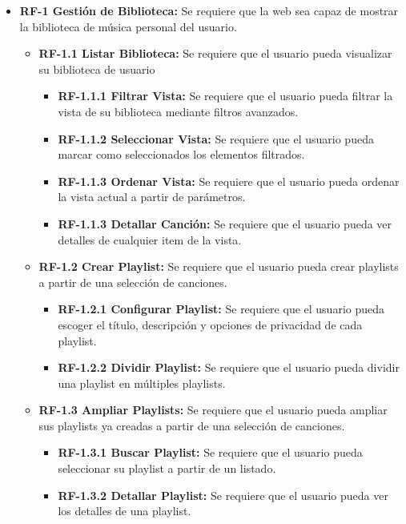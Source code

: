 \begin{itemize}
\tightlist

    \item
        \textbf{RF-1 Gestión de Biblioteca:} Se requiere que la web sea capaz de mostrar la biblioteca de música personal del usuario.
        \begin{itemize}
           \tightlist
           
            \item
                \textbf{RF-1.1 Listar Biblioteca:} Se requiere que el usuario pueda visualizar su biblioteca de usuario
                \begin{itemize}
                    \item
                        \textbf{RF-1.1.1 Filtrar Vista:} Se requiere que el usuario pueda filtrar la vista de su biblioteca mediante filtros avanzados.
                    \item
                        \textbf{RF-1.1.2 Seleccionar Vista:} Se requiere que el usuario pueda marcar como seleccionados los elementos filtrados.
                    \item
                        \textbf{RF-1.1.3 Ordenar Vista:} Se requiere que el usuario pueda ordenar la vista actual a partir de parámetros.
                    \item
                        \textbf{RF-1.1.3 Detallar Canción:} Se requiere que el usuario pueda ver detalles de cualquier item de la vista. 
                \end{itemize}
                
            \item
                \textbf{RF-1.2 Crear Playlist:} Se requiere que el usuario pueda crear playlists a partir de una selección de canciones.   
                \begin{itemize}
                    \item 
                        \textbf{RF-1.2.1 Configurar Playlist:} Se requiere que el usuario pueda escoger el título, descripción y opciones de privacidad de cada playlist.
                    \item 
                        \textbf{RF-1.2.2 Dividir Playlist:} Se requiere que el usuario pueda dividir una playlist en múltiples playlists.
                \end{itemize}
                
            \item
                \textbf{RF-1.3 Ampliar Playlists:} Se requiere que el usuario pueda ampliar sus playlists ya creadas a partir de una selección de canciones.
                \begin{itemize}
                    \item
                        \textbf{RF-1.3.1 Buscar Playlist:} Se requiere que el usuario pueda seleccionar su playlist a partir de un listado.
                    \item
                        \textbf{RF-1.3.2 Detallar Playlist:} Se requiere que el usuario pueda ver los detalles de una playlist.
                \end{itemize}
                

\end{itemize}
\end{itemize}
